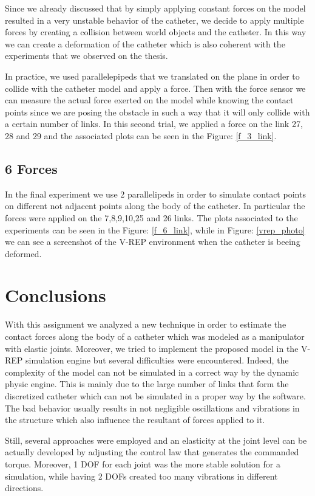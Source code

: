 \documentclass[conference,12pt]{IEEEtran}
\begin{document}
Since we already discussed that by simply applying constant forces on the model resulted in a very unstable behavior of the catheter, we decide to apply multiple forces by creating a collision between world objects and the catheter. In this way we can create a deformation of the catheter which is also coherent with the experiments that we observed on the thesis. 

In practice, we used parallelepipeds that we translated on the plane in order to collide with the catheter model and apply a force. Then with the force sensor we can measure the actual force exerted on the model while knowing the contact points since we are posing the obstacle in such a way that it will only collide with a certain number of links. In this second trial, we applied a force on the link 27, 28 and 29 and the associated plots can be seen in the Figure: \ref{f_3_link}.
   
\subsection{6 Forces}

In the final experiment we use 2 parallelipeds in order to simulate contact points on different not adjacent points along the body of the catheter. In particular the forces were applied on the 7,8,9,10,25 and 26 links. The plots associated to the experiments can be seen in the Figure: \ref{f_6_link}, while in Figure: \ref{vrep_photo} we can see a screenshot of the V-REP environment when the catheter is beeing deformed.


\section*{Conclusions}

With this assignment we analyzed a new technique in order to estimate the contact forces along the body of a catheter which was modeled as a manipulator with elastic joints. Moreover, we tried to implement the proposed model in the V-REP simulation engine but several difficulties were encountered. Indeed, the complexity of the model can not be simulated in a correct way by the dynamic physic engine. This is mainly due to the large number of links that form the discretized catheter which can not be simulated in a proper way by the software. The bad behavior usually results in not negligible oscillations and vibrations in the structure which also influence the resultant of forces applied to it.

Still, several approaches were employed and an elasticity at the joint level can be actually developed by adjusting the control law that generates the commanded torque. Moreover, 1 DOF for each joint was the more stable solution for a simulation, while having 2 DOFs created too many vibrations in different directions.
\end{document}
